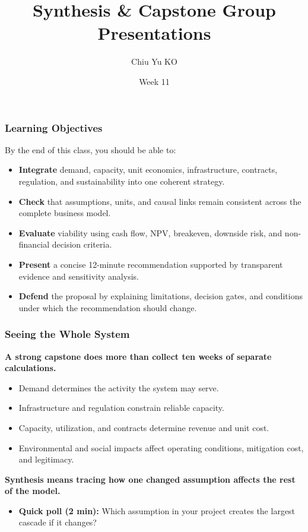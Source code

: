 \documentclass{beamer}
\begin{document}
\begin{frame}
  \title{Synthesis \& Capstone Group Presentations}
  \author{Chiu Yu KO}
  \date{Week 11}
  \titlepage
\end{frame}

\begin{frame}[t]
\frametitle{Learning Objectives}
By the end of this class, you should be able to:
\begin{itemize}
\item \textbf{Integrate} demand, capacity, unit economics, infrastructure, contracts, regulation, and sustainability into one coherent strategy.
\item \textbf{Check} that assumptions, units, and causal links remain consistent across the complete business model.
\item \textbf{Evaluate} viability using cash flow, NPV, breakeven, downside risk, and non-financial decision criteria.
\item \textbf{Present} a concise 12-minute recommendation supported by transparent evidence and sensitivity analysis.
\item \textbf{Defend} the proposal by explaining limitations, decision gates, and conditions under which the recommendation should change.
\end{itemize}
\end{frame}

\begin{frame}[t]
\frametitle{Seeing the Whole System}
\textbf{A strong capstone does more than collect ten weeks of separate calculations.}
\begin{itemize}
\item Demand determines the activity the system may serve.
\item Infrastructure and regulation constrain reliable capacity.
\item Capacity, utilization, and contracts determine revenue and unit cost.
\item Environmental and social impacts affect operating conditions, mitigation cost, and legitimacy.
\end{itemize}
\vspace{0.3cm}
\textbf{Synthesis means tracing how one changed assumption affects the rest of the model.}
\begin{itemize}
\item \textbf{Quick poll (2 min):} Which assumption in your project creates the largest cascade if it changes?
\end{itemize}
\end{frame}
\end{document}
